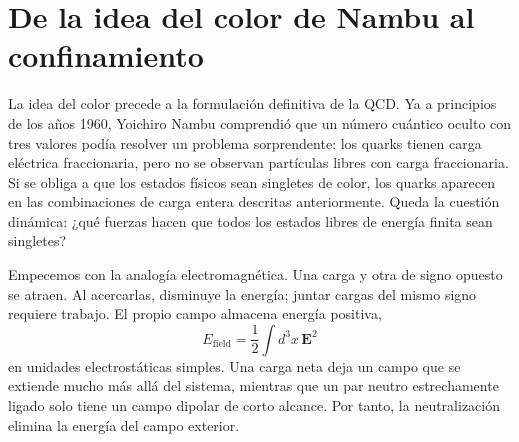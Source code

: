 \begin{classroomqa}
\end{classroomqa}

\begin{classroomqa}
\end{classroomqa}

\section{De la idea del color de Nambu al confinamiento}

La idea del color precede a la formulación definitiva de la QCD. Ya a principios de los años 1960, Yoichiro Nambu comprendió que un número cuántico oculto con tres valores podía resolver un problema sorprendente: los quarks tienen carga eléctrica fraccionaria, pero no se observan partículas libres con carga fraccionaria. Si se obliga a que los estados físicos sean singletes de color, los quarks aparecen en las combinaciones de carga entera descritas anteriormente. Queda la cuestión dinámica: ¿qué fuerzas hacen que todos los estados libres de energía finita sean singletes?

Empecemos con la analogía electromagnética. Una carga y otra de signo opuesto se atraen. Al acercarlas, disminuye la energía; juntar cargas del mismo signo requiere trabajo. El propio campo almacena energía positiva,
\begin{equation}
E_{\mathrm{field}}
=\frac12\int d^3x\,\boldsymbol E^2
\end{equation}
en unidades electrostáticas simples. Una carga neta deja un campo que se extiende mucho más allá del sistema, mientras que un par neutro estrechamente ligado solo tiene un campo dipolar de corto alcance. Por tanto, la neutralización elimina la energía del campo exterior.

